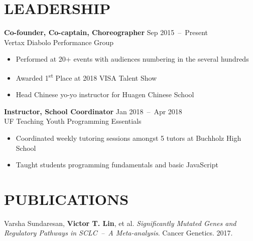 \documentclass[line,resmargin]{res}
\begin{document}
\begin{resume}
\section{LEADERSHIP}
    \textbf{Co-founder, Co-captain, Choreographer}    \hfill Sep 2015~--~Present \\
    Vertax Diabolo Performance Group
    \begin{itemize}  \itemsep -2pt
        \item Performed at 20+ events with audiences numbering in the several hundreds
        \item Awarded 1\textsuperscript{st} Place at 2018 VISA Talent Show
        \item Head Chinese yo-yo instructor for Huagen Chinese School
    \end{itemize}

    \textbf{Instructor, School Coordinator}    \hfill Jan 2018~--~Apr 2018 \\
    UF Teaching Youth Programming Essentials
    \begin{itemize}  \itemsep -2pt
        \item Coordinated weekly tutoring sessions amongst 5 tutors at Buchholz High School
        \item Taught students programming fundamentals and basic JavaScript
    \end{itemize}

\section{PUBLICATIONS}
    Varsha Sundaresan, \textbf{Victor T. Lin}, et al.
    \textit{Significantly Mutated Genes and Regulatory Pathways in SCLC~--~A Meta-analysis}. Cancer Genetics. 2017.

\end{resume}
\end{document}

